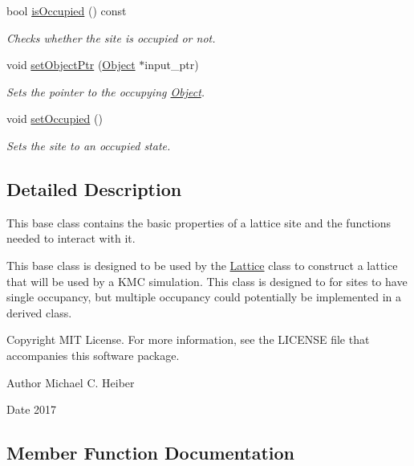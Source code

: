 \begin{DoxyCompactItemize}
bool \hyperlink{class_site_a30991b768ded0bb441c5bb54a789160a}{is\+Occupied} () const
\begin{DoxyCompactList}\small\item\em Checks whether the site is occupied or not. \end{DoxyCompactList}\item 
void \hyperlink{class_site_a9a0d305451d7732dbb193e7fd2f502ca}{set\+Object\+Ptr} (\hyperlink{class_object}{Object} $\ast$input\+\_\+ptr)
\begin{DoxyCompactList}\small\item\em Sets the pointer to the occupying \hyperlink{class_object}{Object}. \end{DoxyCompactList}\item 
\mbox{\label{class_site_ab85bec20c3a6067a7dca659221d57d25}} 
void \hyperlink{class_site_ab85bec20c3a6067a7dca659221d57d25}{set\+Occupied} ()
\begin{DoxyCompactList}\small\item\em Sets the site to an occupied state. \end{DoxyCompactList}\end{DoxyCompactItemize}


\subsection{Detailed Description}
This base class contains the basic properties of a lattice site and the functions needed to interact with it. 

This base class is designed to be used by the \hyperlink{class_lattice}{Lattice} class to construct a lattice that will be used by a K\+MC simulation. This class is designed to for sites to have single occupancy, but multiple occupancy could potentially be implemented in a derived class. \begin{DoxyCopyright}{Copyright}
M\+IT License. For more information, see the L\+I\+C\+E\+N\+SE file that accompanies this software package. 
\end{DoxyCopyright}
\begin{DoxyAuthor}{Author}
Michael C. Heiber 
\end{DoxyAuthor}
\begin{DoxyDate}{Date}
2017 
\end{DoxyDate}


\subsection{Member Function Documentation}
\mbox{\label{class_site_a46ff077954e39046b493ee1ea57a9c93}} 
